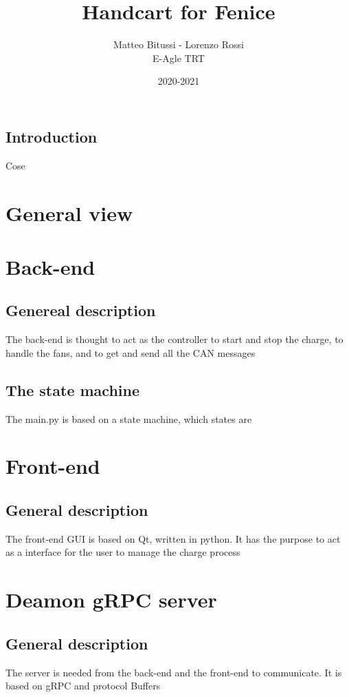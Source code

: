 \documentclass[a4paper]{report}
\title{Handcart for Fenice}
\author{Matteo Bitussi - Lorenzo Rossi\\ E-Agle TRT}
\date{2020-2021}
\begin{document}
  \maketitle

  \tableofcontents

  \section*{Introduction}
  Cose

  \chapter{General view}

  \chapter{Back-end}
  \section{Genereal description}
  The back-end is thought to act as the controller to start and stop the charge, to handle the fans, and to get and send all the CAN messages

  \section{The state machine}
  The main.py is based on a state machine, which states are

  \chapter{Front-end}
  \section{General description}
  The front-end GUI is based on Qt, written in python. It has the purpose to act as a interface for the user to manage the charge process

  \chapter{Deamon gRPC server}
  \section{General description}
  The server is needed from the back-end and the front-end to communicate. It is based on gRPC and protocol Buffers
\end{document}
